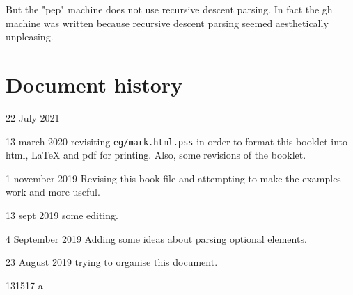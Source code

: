 \documentclass[a4paper,12pt]{article}
\begin{document}
 But the "pep" machine does not use recursive descent parsing. In fact
 the gh machine was written because recursive descent parsing seemed
 aesthetically unpleasing.

\section{Document history}

 22 July 2021
    
 13 march 2020
   revisiting \texttt{eg/mark.html.pss} in order to format this booklet
   into html, \LaTeX{} and pdf for printing. Also, some revisions of
   the booklet.

 1 november 2019
   Revising this book file and attempting to make the examples
   work and more useful.

 13 sept 2019
   some editing.

 4 September 2019
   Adding some ideas about parsing optional elements.

 23 August 2019
   trying to organise this document.

 131517
 a
\end{document}
